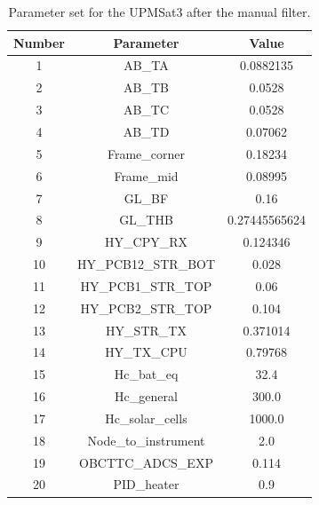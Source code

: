     
    \begin{table}[H]
        \centering
        \caption{Parameter set for the UPMSat3 after the manual filter.}
        \label{tab:manualfilterparamsUPMSat3}
    \begin{tabular}{ccc}
        \hline
        Number & Parameter & Value \\
        \hline
        1 & AB\_TA & 0.0882135 \\
        2 & AB\_TB & 0.0528 \\
        3 & AB\_TC & 0.0528 \\
        4 & AB\_TD & 0.07062 \\
        5 & Frame\_corner & 0.18234 \\
        6 & Frame\_mid & 0.08995 \\
        7 & GL\_BF & 0.16 \\
        8 & GL\_THB & 0.27445565624 \\
        9 & HY\_CPY\_RX & 0.124346 \\
        10 & HY\_PCB12\_STR\_BOT & 0.028 \\
        11 & HY\_PCB1\_STR\_TOP & 0.06 \\
        12 & HY\_PCB2\_STR\_TOP & 0.104 \\
        13 & HY\_STR\_TX & 0.371014 \\
        14 & HY\_TX\_CPU & 0.79768 \\
        15 & Hc\_bat\_eq & 32.4 \\
        16 & Hc\_general & 300.0 \\
        17 & Hc\_solar\_cells & 1000.0 \\
        18 & Node\_to\_instrument & 2.0 \\
        19 & OBCTTC\_ADCS\_EXP & 0.114 \\
        20 & PID\_heater & 0.9 \\
  
        \bottomrule
        \end{tabular}
    \end{table}


